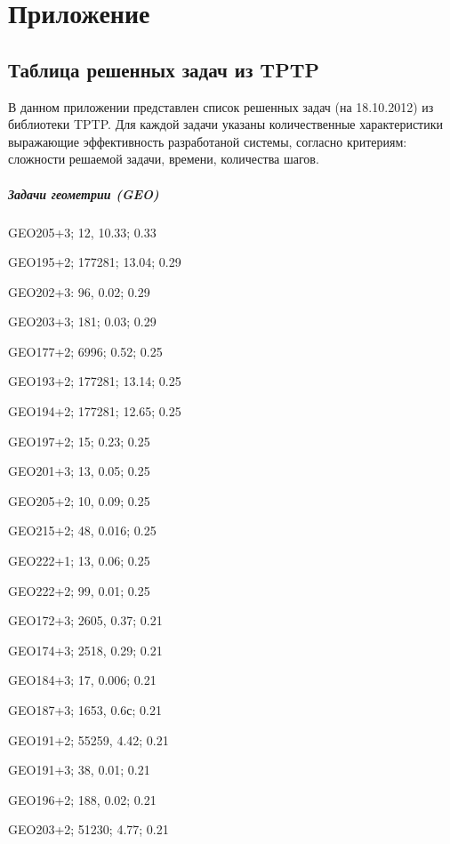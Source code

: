 \chapter*{Приложение}




\section*{Таблица решенных задач из TPTP}
В данном приложении представлен список решенных задач (на 18.10.2012) из библиотеки TPTP. Для каждой задачи указаны количественные характеристики выражающие эффективность разработаной системы, согласно критериям: сложности решаемой задачи, времени, количества шагов.

\paragraph{Задачи геометрии (GEO)}
 
GEO205+3; 12, 10.33; 0.33

GEO195+2; 177281; 13.04; 0.29

GEO202+3: 96, 0.02; 0.29

GEO203+3; 181; 0.03; 0.29

GEO177+2; 6996; 0.52; 0.25

GEO193+2; 177281; 13.14; 0.25

GEO194+2; 177281; 12.65; 0.25

GEO197+2; 15; 0.23; 0.25

GEO201+3; 13, 0.05; 0.25

GEO205+2; 10, 0.09; 0.25

GEO215+2; 48, 0.016; 0.25

GEO222+1; 13, 0.06; 0.25

GEO222+2; 99, 0.01; 0.25

GEO172+3; 2605, 0.37; 0.21

GEO174+3; 2518, 0.29; 0.21

GEO184+3; 17, 0.006; 0.21

GEO187+3; 1653, 0.6с; 0.21

GEO191+2; 55259, 4.42; 0.21

GEO191+3; 38, 0.01; 0.21

GEO196+2; 188, 0.02; 0.21

GEO203+2; 51230; 4.77; 0.21

